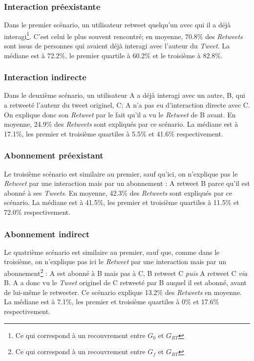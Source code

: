 \documentclass[]{article}
\begin{document}
\subsubsection{Interaction préexistante}

Dans le premier scénario, un utilisateur retweet quelqu'un avec qui il a
déjà interagi\footnote{Ce qui correspond à un recouvrement entre $G_0$
et $G_{RT}$}. C'est celui le plus souvent rencontré; en moyenne,
70.8\% des \emph{Retweets} sont issus de personnes qui avaient déjà 
interagi avec l'auteur du \emph{Tweet}. La médiane est à 72.2\%, le
premier quartile à 60.2\% et le troisième à 82.8\%.

\subsubsection{Interaction indirecte}

Dans le deuxième scénario, un utilisateur A a déjà interagi avec un
autre, B, qui a retweeté l'auteur du tweet originel, C; A n'a pas eu
d'interaction directe avec C. On explique donc son \emph{Retweet} par le
fait qu'il a vu le \emph{Retweet} de B avant. En moyenne, 24.9\% des
\emph{Retweets} sont expliqués par ce scénario. La médiane est à 17.1\%,
les premier et troisième quartiles à 5.5\% et 41.6\% respectivement.

\subsubsection{Abonnement préexistant}

Le troisième scénario est similaire au premier, sauf qu'ici, on
n'explique pas le \emph{Retweet} par une interaction mais par un
abonnement : A retweet B parce qu'il est abonné à ses \emph{Tweets}. En
moyenne, 42.3\% des \emph{Retweets} sont expliqués par ce scénario. La
médiane est à 41.5\%, les premier et troisième quartiles à 11.5\% et
72.0\% respectivement.

\subsubsection{Abonnement indirect}

Le quatrième scénario est similaire au premier, sauf que, comme dans le
troisième, on n'explique pas ici le \emph{Retweet} par une interaction
mais par un abonnement\footnote{Ce qui correspond à un recouvrement entre $G_f$
et $G_{RT}$} : A est abonné à B mais pas à C, B retweet C
\emph{puis} A retweet C \emph{via} B. A a donc vu le \emph{Tweet}
originel de C retweeté par B auquel il est abonné, avant de lui-même le
retweeter. Ce scénario explique 13.2\% des \emph{Retweets} en moyenne.
La médiane est à 7.1\%, les premier et troisième quartiles à 0\% et
17.6\% respectivement.
\end{document}
